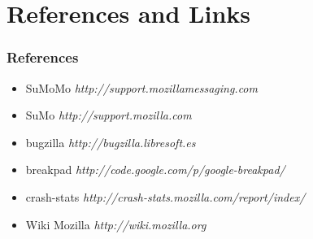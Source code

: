 \documentclass{beamer}
\begin{document}
\section{References and Links}

\begin{frame}
 \frametitle{References}
 \begin{itemize}
    \item SuMoMo \textit{http://support.mozillamessaging.com}
    \item SuMo \textit{http://support.mozilla.com}
    \item bugzilla \textit{http://bugzilla.libresoft.es}
    \item breakpad \textit{http://code.google.com/p/google-breakpad/}
    \item crash-stats \textit{http://crash-stats.mozilla.com/report/index/}
    \item Wiki Mozilla \textit{http://wiki.mozilla.org}
  \end{itemize}

\end{frame}

\end{document}
